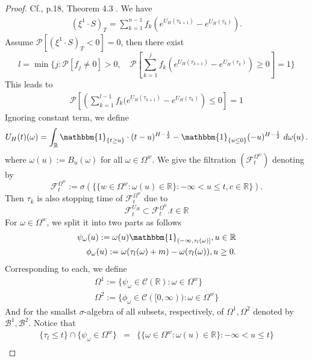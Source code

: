 \documentclass[a4paper, twoside, 11pt]{article}
\theoremstyle{definition}
\newcommand{\brkt}[1]{\left({#1} \right)}
\begin{document}
\begin{proof}
  Cf.\cite{chridito}, p.18, Theorem 4.3 . We have
    \begin{eqnarray*}	
	  (\xi^1 \cdot S)_T = \sum_{k=1}^{n-1} f_k(e^{U_H(\tau_{k+1})} - e^{U_H(\tau_k)}).
	\end{eqnarray*}
  Assume ${\mathcal{P}}[(\xi^1 \cdot S)_T < 0] = 0$, then there exist 
  $$
  l = \min \{ j: \mathcal{P}[f_j \neq 0] > 0,\hspace{1em} \mathcal{P}[\sum_{k=1}^{j} f_k (e^{U_H(\tau_{k+1})} - e^{U_H(\tau_k)})\ge 0]=1 \}
  $$
  This leads to
  \begin{eqnarray*}
	\mathcal{P} \left[\brkt{\sum_{k=1}^{l-1} f_k (e^{U_H(\tau_{k+1})} - e^{U_H(\tau_k)}} \le 0\right] = 1 
  \end{eqnarray*}
  Ignoring constant term, we define 
  $$
  U_H(t)(\omega) = \int_{\mathbb{R}} \mathbbm{1}_{\{t\ge u\}}\cdot (t-u)^{H-\frac{1}{2}} - \mathbbm{1}_{\{u\le 0\}} (-u)^{H-\frac{1}{2}} \, \mathop{d\omega(u)} .
  $$
  where $\omega(u) := B_u(\omega)$ for all $\omega \in \Omega^w$.
  We give the filtration $(\mathcal{F}_t^{\Omega^w})$ denoting by 
  $$
  \mathcal{F}_t^{\Omega^w} := \sigma(\{\{w \in \Omega^w : \omega(u) \in \mathbb{R}\} : -\infty < u \le t, c\in\mathbb{R}\}).
  $$
  Then $\tau_k$ is also stopping time of $\mathcal{F}_t^{\Omega^w}$ due to
  $$
  \mathcal{F}^{U_H}_t \subset \mathcal{F}_t^{\Omega^w}.	t \in \mathbb{R}
  $$
 For $\omega \in \Omega^w$, we split it into two parts as follows
 \begin{eqnarray*}
 \psi_{\omega}(u) := \omega(u)\mathbbm{1}_{(-\infty, \tau_l(\omega)]}, u\in \mathbb{R} \\
   \phi_{\omega}(u) := \omega(\tau_l(\omega) + m) - \omega(\tau_l(\omega)), u\ge 0.
 \end{eqnarray*}
Corresponding to each, we define
\begin{eqnarray*}
  \Omega^1 := \{\psi_{\omega} \in \mathcal{C}(\mathbb{R}) : \omega \in \Omega^w\}\\
  \Omega^2 := \{\phi_{\omega} \in \mathcal{C}([0, \infty)) : \omega \in \Omega^w\}
\end{eqnarray*}
And for the smallst $\sigma$-algebra of all subsets, respectively, of $\Omega^1, \Omega^2$ denoted by $\mathscr{B}^1, \mathscr{B}^2$.
Notice that
\begin{eqnarray*}
  \{\tau_l \le t\} \cap \{\psi_{\omega} \in \Omega^w\} &=& \{\{\omega \in \Omega^w : \omega(u) \in \mathbb{R}\} : -\infty < u \le t\}\\

\end{eqnarray*}
\end{proof}
\end{document}
